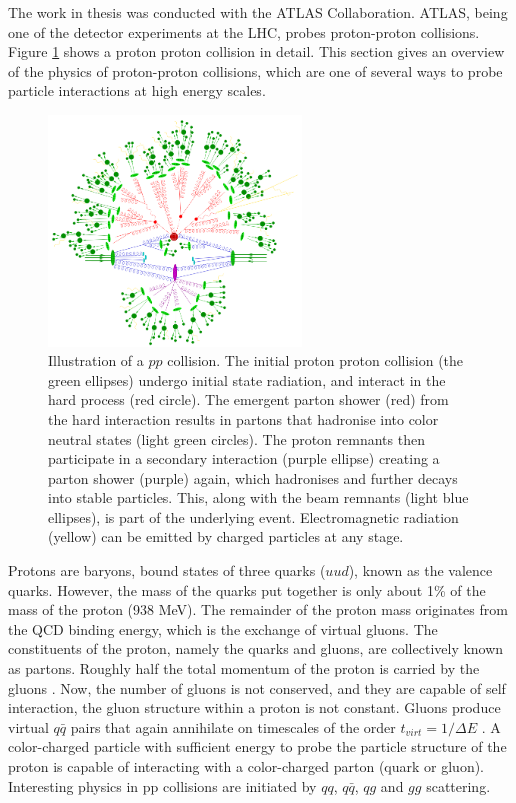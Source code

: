 \documentclass[11pt,a4paper,openright,twoside]{report}
\begin{document}
The work in thesis was conducted with the ATLAS Collaboration. ATLAS, being one of the detector experiments at the LHC, probes proton-proton collisions. Figure \ref{fig:pp} shows a proton proton collision in detail. This section gives an overview of the physics of proton-proton collisions, which are one of several ways to probe particle interactions at high energy scales.

\begin{figure}
\centering
\includegraphics[width=0.6\textwidth]{pp-shower.png}
\caption{Illustration of a $pp$ collision. The initial proton proton collision (the green ellipses) undergo initial state radiation, and interact in the hard process (red circle). The emergent parton shower (red) from the hard interaction results in partons that hadronise into color neutral states (light green circles). The proton remnants then participate in a secondary interaction (purple ellipse) creating a parton shower (purple) again, which hadronises and further decays into stable particles. This, along with the beam remnants (light blue ellipses), is part of the underlying event. Electromagnetic radiation (yellow) can be emitted by charged particles at any stage.}
\label{fig:pp}
\end{figure}

Protons are baryons, bound states of three quarks ($uud$), known as the valence quarks.  However, the mass of the quarks put together is only about 1\% of the mass of the proton (938 MeV). The remainder of the proton mass originates from the QCD binding energy, which is the exchange of virtual gluons. The constituents of the proton, namely the quarks and gluons, are collectively known as partons. Roughly half the total momentum of the proton is carried by the gluons \cite{quarks_and_leptons}. Now, the number of gluons is not conserved, and they are capable of self interaction, the gluon structure within a proton is not constant. Gluons produce virtual $q\bar{q}$ pairs that again annihilate on timescales of the order $t_{virt}=1/\Delta E$ \cite{collider_physics}. A color-charged particle with sufficient energy to probe the particle structure of the proton is capable of interacting with a color-charged parton (quark or gluon). Interesting physics in pp collisions are initiated by $qq$, $q\bar{q}$, $qg$ and $gg$ scattering.
\end{document}
